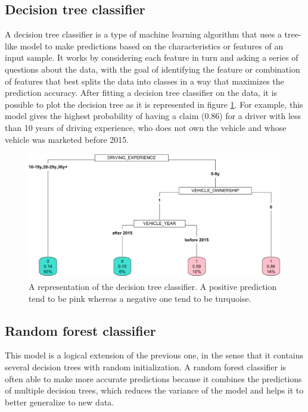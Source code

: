 \documentclass[a4paper,11pt, titlepage]{article}
\begin{document}
\subsection{Decision tree classifier}

A decision tree classifier is a type of machine learning algorithm that uses a tree-like model to make predictions based on the characteristics or features of an input sample. It works by considering each feature in turn and asking a series of questions about the data, with the goal of identifying the feature or combination of features that best splits the data into classes in a way that maximizes the prediction accuracy. After fitting a decision tree classifier on the data, it is possible to plot the decision tree as it is represented in figure \ref{fig:decision-tree}. For example, this model gives the highest probability of having a claim (0.86) for a driver with less than 10 years of driving experience, who does not own the vehicle and whose vehicle was marketed before 2015.

\begin{figure}[h!]
    \centering
    \includegraphics[width=\textwidth]{decision-tree.png}
    \caption{A representation of the decision tree classifier. A positive prediction tend to be pink whereas a negative one tend to be turquoise.}
    \label{fig:decision-tree}
\end{figure}

\subsection{Random forest classifier}

This model is a logical extension of the previous one, in the sense that it contains several decision trees with random initialization. A random forest classifier is often able to make more accurate predictions because it combines the predictions of multiple decision trees, which reduces the variance of the model and helps it to better generalize to new data. 
\end{document}

